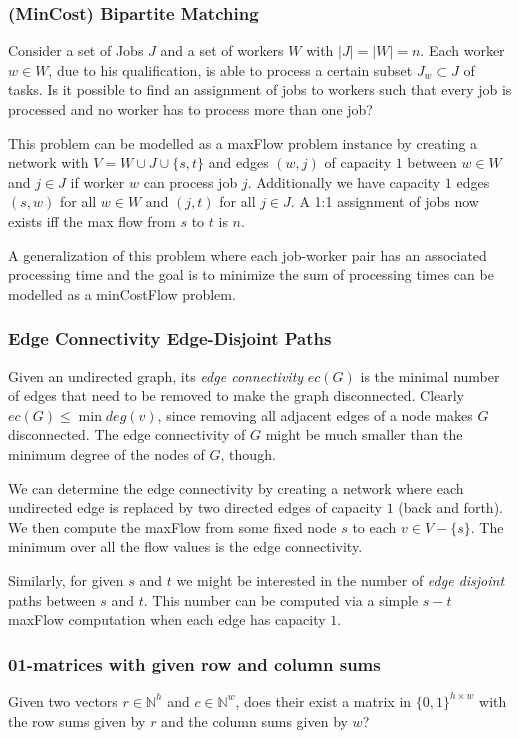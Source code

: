 \documentclass{article}
\begin{document}
\subsubsection{(MinCost) Bipartite Matching}
Consider a set of Jobs $J$ and a set of workers $W$ with $|J|=|W|=n$. Each worker $w\in W$, due to his qualification, is able to process a certain subset $J_w\subset J$ of tasks. Is it possible to find an assignment of jobs to workers such that every job is processed and no worker has to process more than one job?

This problem can be modelled as a maxFlow problem instance by creating a network with $V=W\cup J\cup\{s,t\}$ and edges $(w,j)$ of capacity $1$ between $w\in W$ and $j\in J$ if worker $w$ can process job $j$. Additionally we have capacity $1$ edges $(s,w)$ for all $w\in W$ and $(j,t)$ for all $j\in J$. A 1:1 assignment of jobs now exists iff the max flow from $s$ to $t$ is $n$.

A generalization of this problem where each job-worker pair has an associated processing time and the goal is to minimize the sum of processing times can be modelled as a minCostFlow problem.

\subsubsection{Edge Connectivity Edge-Disjoint Paths}
Given an undirected graph, its \emph{edge connectivity} $ec(G)$ is the minimal number of edges that need to be removed to make the graph disconnected. Clearly $ec(G)\leq \min deg(v)$, since removing all adjacent edges of a node makes $G$ disconnected. The edge connectivity of $G$ might be much smaller than the minimum degree of the nodes of $G$, though.

We can determine the edge connectivity by creating a network where each undirected edge is replaced by two directed edges of capacity $1$ (back and forth). We then compute the maxFlow from some fixed node $s$ to each $v\in V-\{s\}$. The minimum over all the flow values is the edge connectivity.

Similarly, for given $s$ and $t$ we might be interested in the number of \emph{edge disjoint} paths between $s$ and $t$. This number can be computed via a simple $s-t$ maxFlow computation when each edge has capacity $1$.

\subsubsection{01-matrices with given row and column sums}
Given two vectors $r\in \mathbb{N}^h$ and $c\in \mathbb{N}^w$, does their exist a matrix in $\{0,1\}^{h\times w}$ with the row sums given by $r$ and the column sums given by $w$?
\end{document}
